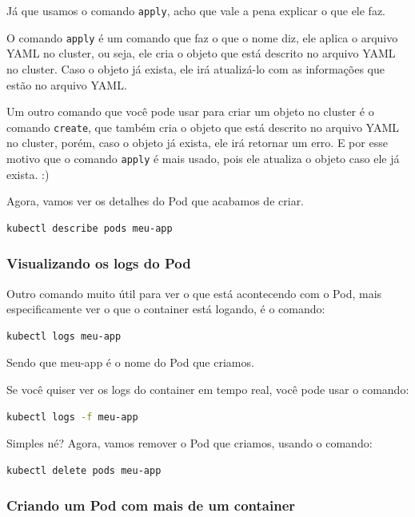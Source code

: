 \documentclass[12pt,a4paper]{article}
\begin{document}
Já que usamos o comando \texttt{apply}, acho que vale a pena explicar o que ele faz.

O comando \texttt{apply} é um comando que faz o que o nome diz, ele aplica o arquivo YAML no cluster, ou seja, ele cria o objeto que está descrito no arquivo YAML no cluster. Caso o objeto já exista, ele irá atualizá-lo com as informações que estão no arquivo YAML.

Um outro comando que você pode usar para criar um objeto no cluster é o comando \texttt{create}, que também cria o objeto que está descrito no arquivo YAML no cluster, porém, caso o objeto já exista, ele irá retornar um erro. E por esse motivo que o comando \texttt{apply} é mais usado, pois ele atualiza o objeto caso ele já exista. :)

Agora, vamos ver os detalhes do Pod que acabamos de criar.

\begin{lstlisting}[language=bash]
kubectl describe pods meu-app
\end{lstlisting}

\subsubsection{Visualizando os logs do Pod}
\label{sec:logs_pod}

Outro comando muito útil para ver o que está acontecendo com o Pod, mais especificamente ver o que o container está logando, é o comando:

\begin{lstlisting}[language=bash]
kubectl logs meu-app
\end{lstlisting}

Sendo que meu-app é o nome do Pod que criamos.

Se você quiser ver os logs do container em tempo real, você pode usar o comando:

\begin{lstlisting}[language=bash]
kubectl logs -f meu-app
\end{lstlisting}

Simples né? Agora, vamos remover o Pod que criamos, usando o comando:

\begin{lstlisting}[language=bash]
kubectl delete pods meu-app
\end{lstlisting}


\subsubsection{Criando um Pod com mais de um container}
\label{sec:pod_multi}
\end{document}
